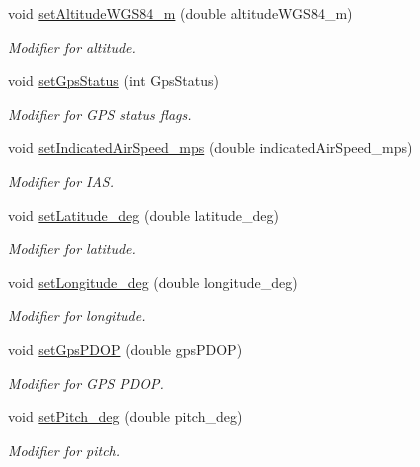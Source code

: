 \begin{DoxyCompactItemize}
void \hyperlink{class_piccolo_telemetry_belief_a9241964a6ca7501a79a3329ad9a9308b}{setAltitudeWGS84\_\-m} (double altitudeWGS84\_\-m)
\begin{DoxyCompactList}\small\item\em Modifier for altitude. \end{DoxyCompactList}\item 
void \hyperlink{class_piccolo_telemetry_belief_abc4c1ab9658367ac849a17d0eb342e7a}{setGpsStatus} (int GpsStatus)
\begin{DoxyCompactList}\small\item\em Modifier for GPS status flags. \end{DoxyCompactList}\item 
void \hyperlink{class_piccolo_telemetry_belief_aefac63a184ec2a61be1fa787649599d5}{setIndicatedAirSpeed\_\-mps} (double indicatedAirSpeed\_\-mps)
\begin{DoxyCompactList}\small\item\em Modifier for IAS. \end{DoxyCompactList}\item 
void \hyperlink{class_piccolo_telemetry_belief_a59da7ccb31ed323314f31e83bfd86306}{setLatitude\_\-deg} (double latitude\_\-deg)
\begin{DoxyCompactList}\small\item\em Modifier for latitude. \end{DoxyCompactList}\item 
void \hyperlink{class_piccolo_telemetry_belief_a8cd3f298e9139821e41a19adac8a4e45}{setLongitude\_\-deg} (double longitude\_\-deg)
\begin{DoxyCompactList}\small\item\em Modifier for longitude. \end{DoxyCompactList}\item 
void \hyperlink{class_piccolo_telemetry_belief_a221b9d4413eb54074a90bbcfd269542f}{setGpsPDOP} (double gpsPDOP)
\begin{DoxyCompactList}\small\item\em Modifier for GPS PDOP. \end{DoxyCompactList}\item 
void \hyperlink{class_piccolo_telemetry_belief_a7be0e19555cd2e456b7b46206c4bf820}{setPitch\_\-deg} (double pitch\_\-deg)
\begin{DoxyCompactList}\small\item\em Modifier for pitch. \end{DoxyCompactList}\item 

\end{DoxyCompactItemize}
